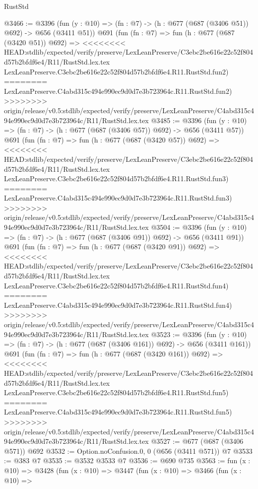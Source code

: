 \begin{lexlean}{RustStd}
\begin{coremodule}
{\begin{coremodule}
{{{{{{{{{{@3466 := @3396
    (fun (y : @10) => (fn : @7) -> (h : @677 (@687 (@3406 @51)) @692) -> @656 (@3411 @51))
    @691
    (fun (fn : @7) =>
    fun (h : @677 (@687 (@3420 @51)) @692) =>
<<<<<<<< HEAD:stdlib/expected/verify/preserve/LexLeanPreserve/C3ebc2be616e22c52f804d57b2bfdf6e4/R11/RustStd.lex.tex
    LexLeanPreserve.C3ebc2be616e22c52f804d57b2bfdf6e4.R11.RustStd.fun2)
========
    LexLeanPreserve.C4abd315c494e990ec9d0d7e3b723964c.R11.RustStd.fun2)
>>>>>>>> origin/release/v0.5:stdlib/expected/verify/preserve/LexLeanPreserve/C4abd315c494e990ec9d0d7e3b723964c/R11/RustStd.lex.tex
@3485 := @3396
    (fun (y : @10) => (fn : @7) -> (h : @677 (@687 (@3406 @57)) @692) -> @656 (@3411 @57))
    @691
    (fun (fn : @7) =>
    fun (h : @677 (@687 (@3420 @57)) @692) =>
<<<<<<<< HEAD:stdlib/expected/verify/preserve/LexLeanPreserve/C3ebc2be616e22c52f804d57b2bfdf6e4/R11/RustStd.lex.tex
    LexLeanPreserve.C3ebc2be616e22c52f804d57b2bfdf6e4.R11.RustStd.fun3)
========
    LexLeanPreserve.C4abd315c494e990ec9d0d7e3b723964c.R11.RustStd.fun3)
>>>>>>>> origin/release/v0.5:stdlib/expected/verify/preserve/LexLeanPreserve/C4abd315c494e990ec9d0d7e3b723964c/R11/RustStd.lex.tex
@3504 := @3396
    (fun (y : @10) => (fn : @7) -> (h : @677 (@687 (@3406 @91)) @692) -> @656 (@3411 @91))
    @691
    (fun (fn : @7) =>
    fun (h : @677 (@687 (@3420 @91)) @692) =>
<<<<<<<< HEAD:stdlib/expected/verify/preserve/LexLeanPreserve/C3ebc2be616e22c52f804d57b2bfdf6e4/R11/RustStd.lex.tex
    LexLeanPreserve.C3ebc2be616e22c52f804d57b2bfdf6e4.R11.RustStd.fun4)
========
    LexLeanPreserve.C4abd315c494e990ec9d0d7e3b723964c.R11.RustStd.fun4)
>>>>>>>> origin/release/v0.5:stdlib/expected/verify/preserve/LexLeanPreserve/C4abd315c494e990ec9d0d7e3b723964c/R11/RustStd.lex.tex
@3523 := @3396
    (fun (y : @10) => (fn : @7) -> (h : @677 (@687 (@3406 @161)) @692) -> @656 (@3411 @161))
    @691
    (fun (fn : @7) =>
    fun (h : @677 (@687 (@3420 @161)) @692) =>
<<<<<<<< HEAD:stdlib/expected/verify/preserve/LexLeanPreserve/C3ebc2be616e22c52f804d57b2bfdf6e4/R11/RustStd.lex.tex
    LexLeanPreserve.C3ebc2be616e22c52f804d57b2bfdf6e4.R11.RustStd.fun5)
========
    LexLeanPreserve.C4abd315c494e990ec9d0d7e3b723964c.R11.RustStd.fun5)
>>>>>>>> origin/release/v0.5:stdlib/expected/verify/preserve/LexLeanPreserve/C4abd315c494e990ec9d0d7e3b723964c/R11/RustStd.lex.tex
@3527 := @677 (@687 (@3406 @571)) @692
@3532 := Option.noConfusion.{0, 0} (@656 (@3411 @571)) @7
@3533 := @383 @7
@3535 := @3532 @3533 @7
@3536 := @690 @735
@3563 := fun (x : @10) =>
  @3428
    (fun (x : @10) =>
    @3447
      (fun (x : @10) =>
      @3466
        (fun (x : @10) =>
}}}}}}}}}}
\end{coremodule}}
\end{coremodule}
\end{lexlean}
